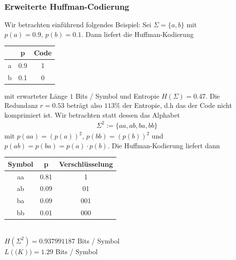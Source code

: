 \documentclass[a4paper,12pt]{article}
\newcounter{Beispiel}
\begin{document}
\subsubsection{Erweiterte Huffman-Codierung}
Wir betrachten einführend folgendes Beispiel: Sei $\Sigma = \{a, b\}$ mit $p(a)=0.9,\,p(b)=0.1$. Dann liefert die Huffman-Kodierung
\begin{center}
\begin{tabular}{c|c|c}
 & p & Code
\\
\hline
a & 0.9 & 1
\\
\hline
b & 0.1 & 0
\end{tabular}
\end{center}
mit erwarteter Länge $1$ Bits / Symbol und Entropie $H(\Sigma)=0.47$. Die Redundanz $r=0.53$ beträgt also $113\%$ der Entropie, d.h das der Code nicht komprimiert ist.
Wir betrachten statt dessen das Alphabet
\begin{align*}
\Sigma^{2}:= \{aa,ab,ba,bb\}
\end{align*}
mit $p(aa)=\left(p(a)\right)^{2}$, $p(bb)=\left(p(b)\right)^{2}$ und $p(ab)= p(ba) =p(a)\cdot p(b)$. Die Huffman-Kodierung liefert dann
\par
\hspace{1.5cm}
\begin{minipage}[h]{.5\textwidth}
\begin{tabular}{c|c|c}
Symbol & p & Verschlüsselung
\\
\hline
aa & 0.81 & 1
\\
\hline
ab & 0.09 & 01
\\
\hline
ba & 0.09 & 001
\\
\hline
bb & 0.01 & 000
\end{tabular}
\\
$H(\Sigma^{2})= 0.937991187$ Bits / Symbol
\\
$L(\mathcal(K)) = 1.29$ Bits / Symbol
\end{minipage}
\hfill
 \begin{minipage}[h]{.5\textwidth}
\begin{flushright}
\end{flushright}
\hspace{1.5cm} 
\end{minipage} 
\end{document}
